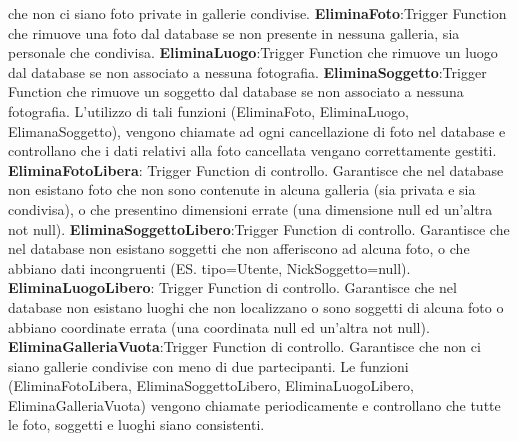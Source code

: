 che non ci siano foto private in gallerie condivise.
\newline
\newline
\newline
\textbf{EliminaFoto}:Trigger Function che rimuove una foto dal
database se non presente in nessuna galleria, sia personale che
condivisa.
\newline
\newline
\textbf{EliminaLuogo}:Trigger Function che rimuove un luogo dal
database se non associato a nessuna fotografia.
\newline
\newline
\textbf{EliminaSoggetto}:Trigger Function che rimuove un soggetto dal
database se non associato a nessuna fotografia.
\newline
L'utilizzo di tali funzioni (EliminaFoto, EliminaLuogo, ElimanaSoggetto), vengono chiamate ad ogni cancellazione di foto nel database e controllano che i dati relativi alla foto cancellata vengano
correttamente gestiti.
\newline
\newline
\textbf{EliminaFotoLibera}: Trigger Function di controllo. Garantisce che nel database non esistano foto che non sono contenute in alcuna galleria (sia privata e sia condivisa), o che presentino dimensioni errate (una dimensione null ed un'altra not null).
\newline
\newline
\textbf{EliminaSoggettoLibero}:Trigger Function di controllo.
Garantisce che nel database non esistano soggetti che non
afferiscono ad alcuna foto, o che abbiano dati incongruenti (ES. tipo=Utente, NickSoggetto=null).
\newline
\newline
\textbf{EliminaLuogoLibero}: Trigger Function di controllo. Garantisce
che nel database non esistano luoghi che non localizzano o
sono soggetti di alcuna foto o abbiano coordinate errata (una coordinata null ed un'altra not null).
\newline
\newline
\textbf{EliminaGalleriaVuota}:Trigger Function di controllo. Garantisce
che non ci siano gallerie condivise con meno di due partecipanti.
\newline
Le funzioni (EliminaFotoLibera, EliminaSoggettoLibero,
EliminaLuogoLibero, EliminaGalleriaVuota) vengono chiamate
periodicamente e controllano che tutte le foto, soggetti e
luoghi siano consistenti.